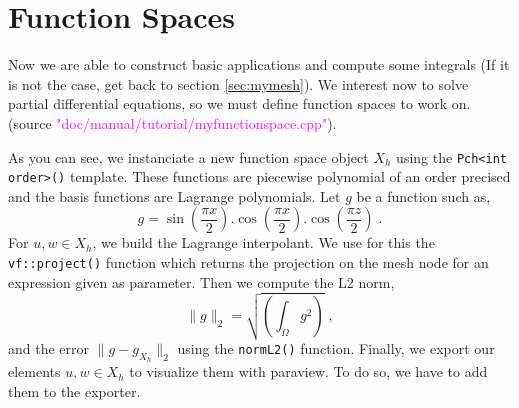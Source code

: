 %


\section{Function Spaces}
\label{sec:myfunctionspace}

Now we are able to construct basic \feel applications and compute some integrals 
(If it is not the case, get back to section \ref{sec:mymesh}).
We interest now to solve partial differential equations, so we must define function spaces
to work on. (source \textcolor{magenta}{"doc/manual/tutorial/myfunctionspace.cpp"}).
%
\vspace{2mm}

\vspace{2mm}
%
As you can see, we instanciate a new function space object $X_h$ using the \lstinline!Pch<int order>()!
template. These functions are piecewise polynomial of an order precised and the basis functions are
Lagrange polynomials.
Let $g$ be a function such as,
%
\[
    g= \sin(\frac{\pi x}{2}).\cos(\frac{\pi x}{2}).\cos(\frac{\pi z}{2}) \;.
\]
%
For $u,w\in X_h$, we build the Lagrange interpolant. We use for this the
\lstinline!vf::project()! function  which returns the projection on the mesh node for
an expression given as parameter. Then we compute the L2 norm,
%
\[
    \| g \|_2 =
    \sqrt{\left( \int_\Omega g^2 \right)} \;,
\]
%
and the error $\| g - g_{X_h}\|_2$
using the \lstinline!normL2()! function.
Finally, we export our elements $u,w\in X_h$ to visualize them with paraview.
To do so, we have to add them to the exporter.

